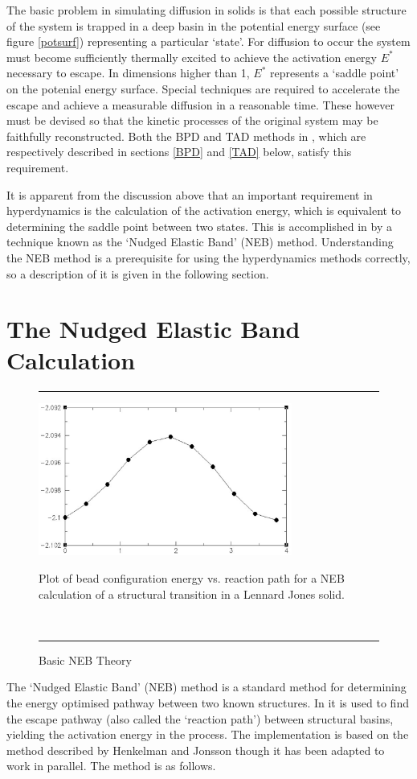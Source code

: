 The basic problem in simulating diffusion in solids is that each
possible structure of the system is trapped in a deep basin in
the potential energy surface (see figure \ref{potsurf}) representing a
particular `state'. For diffusion to occur the system must become
sufficiently thermally excited to achieve the activation energy
$E^{*}$ necessary to escape.  In dimensions higher than 1, $E^{*}$
represents a `saddle point' on the potenial energy surface.  Special
techniques are required to accelerate the escape and achieve a
measurable diffusion in a reasonable time. These however must be
devised so that the kinetic processes of the original system may be
faithfully reconstructed. Both the BPD and TAD methods in \D{}, which
are respectively described in sections \ref{BPD} and \ref{TAD} below,
satisfy this requirement.

It is apparent from the discussion above that an important requirement
in hyperdynamics is the calculation of the activation energy, which is
equivalent to determining the saddle point between two states. This is
accomplished in \D{} by a technique known as the `Nudged Elastic Band'
(NEB) method. Understanding the NEB method is a prerequisite for using
the \D{} hyperdynamics methods correctly, so a description of it is
given in the following section.

\section{The Nudged Elastic Band Calculation}

\label{NEB}
\begin{figure}[ht]
\hrule
\vspace{1.0cm}
\begin{center}
\includegraphics[height=5cm]{NEB.ps}
\end{center}
\caption{Basic NEB Theory\label{nebfig}}
Plot of bead configuration energy vs. reaction path for a NEB
calculation of a structural transition in a Lennard Jones solid.

~
\hrule
\end{figure}
The `Nudged Elastic Band' (NEB) method is a standard method for
determining the energy optimised pathway between two known
structures. In \D{} it is used to find the escape pathway (also called
the `reaction path')  between
structural basins, yielding the activation energy in the process. The
implementation is based on the method described by Henkelman and
Jonsson\cite{henkelman-00a} though it has been adapted to work in
parallel. The method is as follows.

